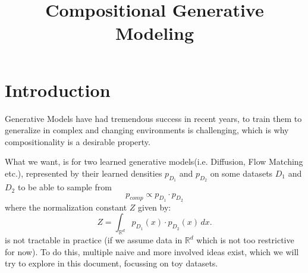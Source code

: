 \documentclass{article}
\title{Compositional Generative Modeling}
\author{ }
\date{}
\makeatletter
\newcommand{\mathleft}{\@fleqntrue\@mathmargin10pt}
\newcommand{\R}{\mathbb{R}}
\makeatother
\begin{document}
\maketitle

\newlength\breite
\setlength\breite{\linewidth-4pt}
\setlength\fboxsep{0pt}
\setlength\fboxrule{0.25pt}
\setlength{\abovedisplayskip}{3mm} %
\setlength{\belowdisplayskip}{3mm} %
\setlength\itemsep{0pt}
\setlength\parindent{0pt}


\mathleft

\section*{Introduction}

Generative Models have had tremendous success in recent years, to train them to generalize in complex and changing environments is challenging, which is why compositionality is a desirable property. 

What we want, is for two learned generative models(i.e. Diffusion, Flow Matching etc.), represented by their learned densities $p_{D_1}$ and $p_{D_2}$ on some datasets $D_1$ and $D_2$ to be able to sample from $$p_{comp} \propto p_{D_1} \cdot p_{D_2}$$ where the normalization constant $Z$ given by:
\[
Z = \int_{\R^d} p_{D_1}(x) \cdot p_{D_2}(x) \, dx.
\]
is not tractable in practice (if we assume data in $\R^d$ which is not too restrictive for now). To do this, multiple naive and more involved ideas exist, which we will try to explore in this document, focussing on toy datasets.
\end{document}
